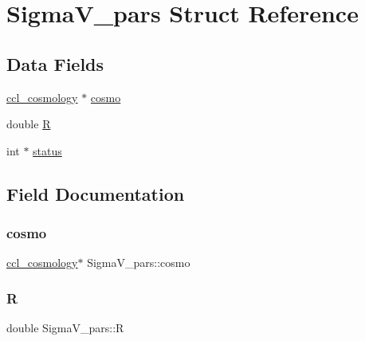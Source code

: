 \hypertarget{struct_sigma_v__pars}{}\section{Sigma\+V\+\_\+pars Struct Reference}
\label{struct_sigma_v__pars}
\subsection*{Data Fields}
\begin{DoxyCompactItemize}
\item 
\mbox{\hyperlink{structccl__cosmology}{ccl\+\_\+cosmology}} $\ast$ \mbox{\hyperlink{struct_sigma_v__pars_ae2e72012573ea52acb95056ada601c8c}{cosmo}}
\item 
double \mbox{\hyperlink{struct_sigma_v__pars_adca52de69692988b0a2bbafa53bf76c9}{R}}
\item 
int $\ast$ \mbox{\hyperlink{struct_sigma_v__pars_a81f5bd1b0ecf3b2e17ae4e49228b3a43}{status}}
\end{DoxyCompactItemize}


\subsection{Field Documentation}
\mbox{\label{struct_sigma_v__pars_ae2e72012573ea52acb95056ada601c8c}} 
\subsubsection{\texorpdfstring{cosmo}{cosmo}}
{\footnotesize\ttfamily \mbox{\hyperlink{structccl__cosmology}{ccl\+\_\+cosmology}}$\ast$ Sigma\+V\+\_\+pars\+::cosmo}

\mbox{\label{struct_sigma_v__pars_adca52de69692988b0a2bbafa53bf76c9}} 
\subsubsection{\texorpdfstring{R}{R}}
{\footnotesize\ttfamily double Sigma\+V\+\_\+pars\+::R}

\mbox{\label{struct_sigma_v__pars_a81f5bd1b0ecf3b2e17ae4e49228b3a43}} 
